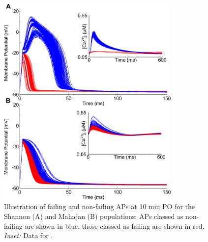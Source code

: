 \documentclass[../thesis-main.tex]{subfiles}
\begin{document}
\begin{figure}
 \centering
 \includegraphics[width=0.8\textwidth]{fail-isch17}
 \caption[Illustration of failing and non-failing APs during isch\ae{}mia.]{Illustration of failing and non-failing APs at 10 min PO for the Shannon (A) and Mahajan (B) populations; APs classed as non-failing are shown in blue, those classed as failing are shown in red. \emph{Inset:} Data for \cai{}.}
 \label{fig:fail-isch17}
\end{figure}

\biblio
\end{document}
